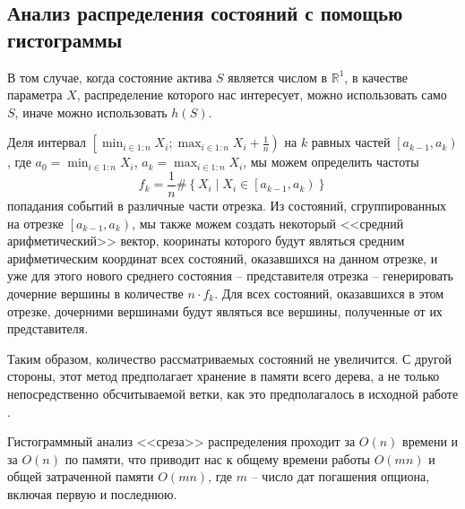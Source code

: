 \documentclass[12pt,twoside,titlepage,сa4paper]{article}
\newcommand{\R}{\ensuremath{\mathbb{R}}}
\begin{document}
	\subsection{Анализ распределения состояний с помощью гистограммы}
		\par В том случае, когда состояние актива $S$ является числом в $\R ^1$, в качестве параметра $X$, распределение которого нас интересует, можно использовать  само $S$, иначе можно использовать $h(S)$. 
		\par Деля интервал $\left[\min_{i\in 1:n} X_i ; \max_{i\in 1:n} X_i + \frac{1}{n}\right)$ на $k$ равных частей $\left[a_{k-1},a_k\right)$, где $a_0 = \min_{i\in 1:n} X_i$, $a_k = \max_{i\in 1:n} X_i$, мы можем определить частоты \[f_k = \frac{1}{n}\#\left\lbrace X_i \middle\vert X_i\in\left[a_{k-1},a_k\right)\right\rbrace\] попадания событий в различные части отрезка. Из состояний, сгруппированных на отрезке $\left[a_{k-1},a_k\right)$, мы также можем создать некоторый <<средний арифметический>> вектор, кооринаты которого будут являться средним арифметическим координат всех состояний, оказавшихся на данном отрезке, и уже для этого нового среднего состояния -- представителя отрезка -- генерировать дочерние вершины в количестве $n\cdot f_k$. Для всех состояний, оказавшихся в этом отрезке, дочерними вершинами будут являться все вершины, полученные от их представителя. 
		\par Таким образом, количество рассматриваемых состояний не увеличится. С другой стороны, этот метод предполагает хранение в памяти всего дерева, а не только непосредственно обсчитываемой ветки, как это предполагалось в исходной работе \cite{Broadie1997}.
		\par Гистограммный анализ <<среза>> распределения проходит за $O\left(n\right)$ времени и за $O\left(n\right)$ по памяти, что приводит нас к общему времени работы $O\left(mn\right)$ и общей затраченной памяти $O\left(mn\right)$, где $m$ -- число дат погашения опциона, включая первую и последнюю.
\end{document}
